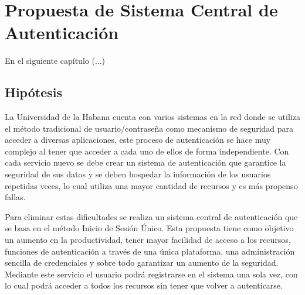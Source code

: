 \chapter{Propuesta de Sistema Central de Autenticación}\label{chapter:proposal}
En el siguiente capítulo (...)
\section*{Hipótesis}
La Universidad de la Habana cuenta con varios sistemas en la red donde se utiliza el método tradicional de usuario/contraseña como mecanismo de seguridad para acceder a diversas aplicaciones, este proceso de autenticación se hace muy complejo al tener que acceder a cada uno de ellos de forma independiente. Con cada servicio nuevo se debe crear un sistema de autenticación que garantice la seguridad de sus datos y se deben hospedar la información de los usuarios repetidas veces, lo cual utiliza una mayor cantidad de recursos y es más propenso fallas.

Para eliminar estas dificultades se realiza un sistema central de autenticación que se basa en el método Inicio de Sesión Único. Esta propuesta tiene como objetivo un aumento en la productividad, tener mayor facilidad de acceso a los recursos, funciones de autenticación a través de una única plataforma, una administración sencilla de credenciales y sobre todo garantizar un aumento de la seguridad. Mediante este servicio el usuario podrá registrarse en el sistema una sola vez, con lo cual podrá acceder a todos los recursos sin tener que volver a autenticarse.




